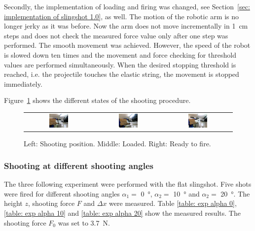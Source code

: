			Secondly, the implementation of loading and firing was changed, see Section~\ref{sec: implementation of slingshot 1.0}, as well. The motion of the robotic arm is no longer jerky as it was before. Now the arm does not move incrementally in \SI{1}{cm} steps and does not check the measured force value only after one step was performed.  The smooth movement was achieved. However, the speed of the robot is slowed down ten times and the movement and force checking for threshold values are performed simultaneously. When the desired stopping threshold is reached, i.e. the projectile touches the elastic string, the movement is stopped immediately.

			Figure~\ref{fig: shooting process 2.0} shows the different states of the shooting procedure.

			\begin{figure}[h]
			\centering
			\begin{tabular}{ccc}
			\includegraphics[width=0.3\textwidth]{shooting_posAdj.png}
			&
			\includegraphics[width=0.3\textwidth]{loadAdj.png}
			&
			\includegraphics[width=0.3\textwidth]{fireAdj.png}
			\end{tabular}
			\caption{Left: Shooting position. Middle: Loaded. Right: Ready to fire.}
			\label{fig: shooting process 2.0}
			\end{figure}

		\subsubsection{Shooting at different shooting angles}
			The three following experiment were performed with the flat slingshot. Five shots were fired for different shooting angles $ \alpha_{1} = $ \SI{0}{\degree}, $ \alpha_{2} = $ \SI{10}{\degree} and $ \alpha_{2} = $ \SI{20}{\degree}. The height $ z $, shooting force $F$ and $\Delta x$ were measured. Table \ref{table: exp alpha 0}, \ref{table: exp alpha 10} and \ref{table: exp alpha 20} show the measured results. The shooting force $F_0$ was set to \SI{3.7}{N}.


